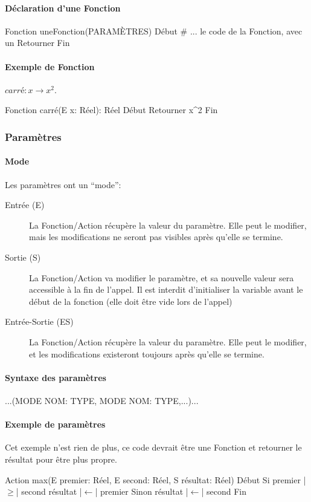 \documentclass[10pt,a4paper,french]{article}
\begin{document}
\paragraph{Déclaration d'une Fonction}
\begin{exalgo}
Fonction uneFonction(PARAMÈTRES)
Début
	# ... le code de la Fonction, avec un Retourner
Fin
\end{exalgo}

\paragraph{Exemple de Fonction}
$carré: x \rightarrow x^2$.
\begin{exalgo}
Fonction carré(E x: Réel): Réel
Début
	Retourner x^2
Fin
\end{exalgo}

\subsubsection{Paramètres}

\paragraph{Mode}
Les paramètres ont un ``mode'':
\begin{description}
\item[Entrée (E)] La Fonction/Action récupère la valeur du paramètre. Elle peut le modifier, mais les modifications ne seront pas visibles après qu'elle se termine.
\item[Sortie (S)] La Fonction/Action va modifier le paramètre, et sa nouvelle valeur sera accessible à la fin de l'appel. Il est interdit d'initialiser la variable avant le début de la fonction (elle doit être vide lors de l'appel)
\item[Entrée-Sortie (ES)] La Fonction/Action récupère la valeur du paramètre. Elle peut le modifier, et les modifications existeront toujours après qu'elle se termine.
\end{description}

\paragraph{Syntaxe des paramètres}
\begin{exalgo}
...(MODE NOM: TYPE, MODE NOM: TYPE,...)...
\end{exalgo}

\paragraph{Exemple de paramètres}
Cet exemple n'est rien de plus, ce code devrait être une Fonction et retourner le résultat pour être plus propre.
\begin{exalgo}
Action max(E premier: Réel,
           E second: Réel,
           S résultat: Réel)
Début
    Si premier |$\geq$| second
        résultat |$\leftarrow$| premier
    Sinon
        résultat |$\leftarrow$| second
Fin
\end{exalgo}
\end{document}

